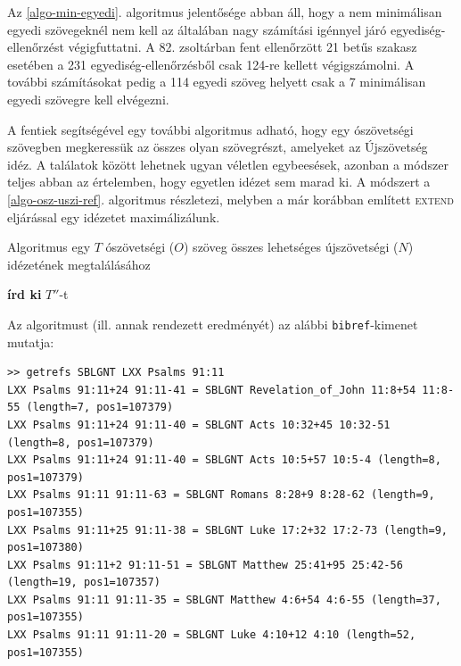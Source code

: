 \documentclass{article}
\begin{document}
Az \ref{algo-min-egyedi}. algoritmus jelentősége abban áll, hogy a nem minimálisan egyedi
szövegeknél nem kell az általában nagy számítási igénnyel járó egyediség-ellenőrzést
végigfuttatni. A 82. zsoltárban fent ellenőrzött 21 betűs szakasz esetében a 231 egyediség-ellenőrzésből
csak 124-re kellett végigszámolni. A további számításokat pedig a 114 egyedi szöveg helyett
csak a 7 minimálisan egyedi szövegre kell elvégezni.

A fentiek segítségével egy további algoritmus adható, hogy egy ószövetségi szövegben megkeressük
az összes olyan szövegrészt, amelyeket az Újszövetség idéz. A találatok között lehetnek
ugyan véletlen egybeesések, azonban a módszer teljes abban az értelemben, hogy egyetlen
idézet sem marad ki. A módszert a \ref{algo-osz-uszi-ref}. algoritmus részletezi, melyben a már korábban
említett \textsc{extend} eljárással egy idézetet maximálizálunk.

\begin{algorithm}
\caption{Algoritmus egy $T$ ószövetségi ($O$) szöveg összes lehetséges
újszövetségi ($N$) idézetének megtalálásához}
\label{algo-osz-uszi-ref}
\begin{algorithmic}[1]
         \State \textbf{írd ki} {$T''$}-t
        \EndIf
       \EndFor
      \EndFor
    \EndIf
   \EndFor
  \EndFor
 \EndFor
\EndProcedure
\end{algorithmic}
\end{algorithm}

Az algoritmust (ill. annak rendezett eredményét) az alábbi \texttt{bibref}-kimenet mutatja:

\begin{lstlisting}
>> getrefs SBLGNT LXX Psalms 91:11
LXX Psalms 91:11+24 91:11-41 = SBLGNT Revelation_of_John 11:8+54 11:8-55 (length=7, pos1=107379)
LXX Psalms 91:11+24 91:11-40 = SBLGNT Acts 10:32+45 10:32-51 (length=8, pos1=107379)
LXX Psalms 91:11+24 91:11-40 = SBLGNT Acts 10:5+57 10:5-4 (length=8, pos1=107379)
LXX Psalms 91:11 91:11-63 = SBLGNT Romans 8:28+9 8:28-62 (length=9, pos1=107355)
LXX Psalms 91:11+25 91:11-38 = SBLGNT Luke 17:2+32 17:2-73 (length=9, pos1=107380)
LXX Psalms 91:11+2 91:11-51 = SBLGNT Matthew 25:41+95 25:42-56 (length=19, pos1=107357)
LXX Psalms 91:11 91:11-35 = SBLGNT Matthew 4:6+54 4:6-55 (length=37, pos1=107355)
LXX Psalms 91:11 91:11-20 = SBLGNT Luke 4:10+12 4:10 (length=52, pos1=107355)
\end{lstlisting}
\end{document}

